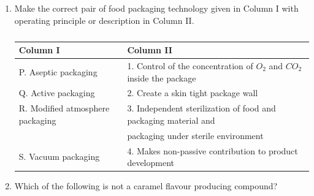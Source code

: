 \documentclass[journal,12pt,onecolumn]{IEEEtran}
\theoremstyle{remark}
\begin{document}
\begin{enumerate}
    \item Make the correct pair of food packaging technology given in Column I with operating principle or description in Column II.

    \hfill{}
    \begin{table}[h!]
    \centering
    \caption*{}
    \label{tab:q113}
    \begin{tabular}{ll}
    \hline
    \textbf{Column I} & \textbf{Column II} \\
    \hline
    P. Aseptic packaging & 1. Control of the concentration of $O_2$ and $CO_2$ inside the package \\
    Q. Active packaging & 2. Create a skin tight package wall \\
    R. Modified atmosphere packaging & 3. Independent sterilization of food and packaging material and \\
     & packaging under sterile environment \\
    S. Vacuum packaging & 4. Makes non-passive contribution to product development \\
    \hline
    \end{tabular}
    \end{table}
    \begin{enumerate}
    \end{enumerate}

    \item Which of the following is not a caramel flavour producing compound?

    \hfill{}
    \begin{enumerate}
    \end{enumerate}


\end{enumerate}
\end{document}
